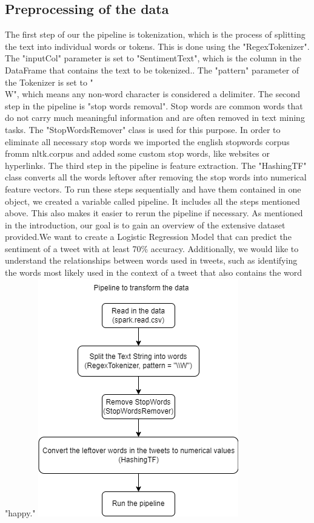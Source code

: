 \documentclass[11pt,a4paper]{article}
\begin{document}
\subsection{Preprocessing of the data}
The first step of our the pipeline is tokenization, which is the process of splitting the text into individual words or tokens. This is done using the "RegexTokenizer". The "inputCol" parameter is set to "SentimentText", which is the column in the DataFrame that contains the text to be tokenized.. The "pattern" parameter of the Tokenizer is set to "\\W", which means any non-word character is considered a delimiter. The second step in the pipeline is "stop words removal". Stop words are common words that do not carry much meaningful information and are often removed in text mining tasks. The "StopWordsRemover" class is used for this purpose. In order to eliminate all necessary stop words we imported the english stopwords corpus fromm nltk.corpus and added some custom stop words, like websites or hyperlinks. The third step in the pipeline is feature extraction. The "HashingTF" class converts all the words leftover after removing the stop words into numerical feature vectors.
To run these steps sequentially and have them contained in one object, we created a variable called pipeline. It includes all the steps mentioned above. This also makes it easier to rerun the pipeline if necessary. As mentioned in the introduction, our goal is to gain an overview of the extensive dataset provided.We want to create a Logistic Regression Model that can predict the sentiment of a tweet with at least 70\% accuracy. Additionally, we would like to understand the relationships between words used in tweets, such as identifying the words most likely used in the context of a tweet that also contains the word "happy."
\includegraphics[scale = 0.5]{pipeline}
\end{document}
